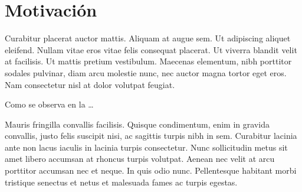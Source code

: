 
\section{Motivación}
\label{sec:motivaton}
Curabitur placerat auctor mattis. Aliquam at augue sem. Ut adipiscing aliquet
eleifend. Nullam vitae eros vitae felis consequat placerat. Ut viverra blandit
velit at facilisis. Ut mattis pretium vestibulum. Maecenas elementum, nibh
porttitor sodales pulvinar, diam arcu molestie nunc, nec auctor magna tortor
eget eros. Nam consectetur nisl at dolor volutpat feugiat. 

Como se observa en la  \ldots


Mauris fringilla convallis facilisis. Quisque condimentum, enim in gravida
convallis, justo felis suscipit nisi, ac sagittis turpis nibh in sem. Curabitur
lacinia ante non lacus iaculis in lacinia turpis consectetur. Nunc sollicitudin
metus sit amet libero accumsan at rhoncus turpis volutpat. Aenean nec velit at
arcu porttitor accumsan nec et neque. In quis odio nunc. Pellentesque habitant
morbi tristique senectus et netus et malesuada fames ac turpis egestas.
